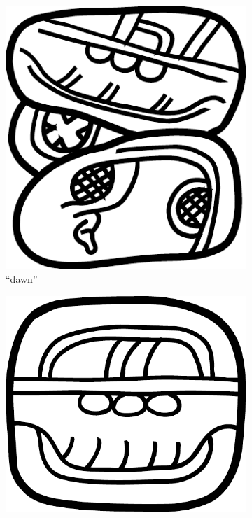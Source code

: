 \documentclass[../main.tex]{subfiles}
\begin{document}
\begin{figure}
    \centering
    \begin{subfigure}[b]{0.24\textwidth}
        \centering
        \includegraphics[height=\glyphblockheight]{img/grapheme-PAS}
        \caption{ ``dawn''}
        \label{fig:terminology-glyphs-pas}
    \end{subfigure}
    \hfill
    \begin{subfigure}[b]{0.24\textwidth}
        \centering
        \includegraphics[height=\glyphblockheight]{img/grapheme-CHAN}

\end{subfigure}
\end{figure}
\end{document}
